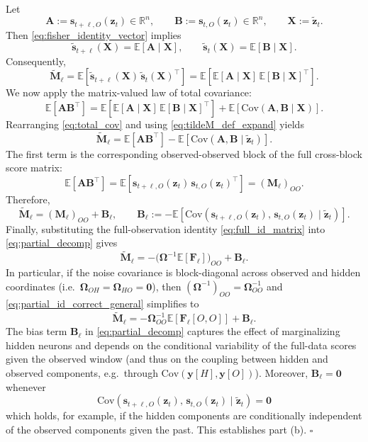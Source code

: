\documentclass{article}
\theoremstyle{plain}
\theoremstyle{definition}
\theoremstyle{remark}
\newcommand{\R}{\mathbb{R}}
\newcommand{\E}{\mathbb{E}}
\newcommand{\Cov}{\mathrm{Cov}}
\newcommand{\1}{\mathbf{1}}
\newcommand{\y}{\bm{y}}
\newcommand{\z}{\bm{z}}
\newcommand{\s}{\bm{s}}
\begin{document}
Let
$$
\bm{A}:=\s_{t+\ell,O}(\z_t)\in\R^{n},
\qquad
\bm{B}:=\s_{t,O}(\z_t)\in\R^{n},
\qquad
\bm{X}:=\tilde{\z}_t.
$$
Then \eqref{eq:fisher_identity_vector} implies
$$
\tilde{\s}_{t+\ell}(\bm{X}) = \E[\bm{A}\mid \bm{X}],
\qquad
\tilde{\s}_{t}(\bm{X}) = \E[\bm{B}\mid \bm{X}].
$$
Consequently,
\begin{equation}
\tilde{\bm{M}}_\ell
=
\E\!\left[\tilde{\s}_{t+\ell}(\bm{X})\,\tilde{\s}_{t}(\bm{X})^\top\right]
=
\E\!\left[\E[\bm{A}\mid \bm{X}]\,\E[\bm{B}\mid \bm{X}]^\top\right].
\label{eq:tildeM_def_expand}
\end{equation}
We now apply the matrix-valued law of total covariance:
\begin{equation}
\E[\bm{A}\bm{B}^\top]
=
\E\!\left[\E[\bm{A}\mid \bm{X}]\,\E[\bm{B}\mid \bm{X}]^\top\right]
+
\E\!\left[\Cov(\bm{A},\bm{B}\mid \bm{X})\right].
\label{eq:total_cov}
\end{equation}
Rearranging \eqref{eq:total_cov} and using \eqref{eq:tildeM_def_expand} yields
\begin{equation}
\tilde{\bm{M}}_\ell
=
\E[\bm{A}\bm{B}^\top]
-
\E\!\left[\Cov(\bm{A},\bm{B}\mid \tilde{\z}_t)\right].
\label{eq:tildeM_totalcov}
\end{equation}
The first term is the corresponding observed-observed block of the full cross-block score matrix:
$$
\E[\bm{A}\bm{B}^\top]
=
\E\!\left[\s_{t+\ell,O}(\z_t)\,\s_{t,O}(\z_t)^\top\right]
=
(\bm{M}_\ell)_{OO}.
$$
Therefore,
\begin{equation}
\tilde{\bm{M}}_\ell
=
(\bm{M}_\ell)_{OO}
+
\bm{B}_\ell,
\qquad
\bm{B}_\ell
:=
-\E\!\left[\Cov\!\left(\s_{t+\ell,O}(\z_t),\,\s_{t,O}(\z_t)\mid \tilde{\z}_t\right)\right].
\label{eq:partial_decomp}
\end{equation}
Finally, substituting the full-observation identity \eqref{eq:full_id_matrix} into \eqref{eq:partial_decomp} gives
\begin{equation}
\tilde{\bm{M}}_\ell
=
-\bigl(\bm{\Omega}^{-1}\E[\bm{F}_\ell]\bigr)_{OO}
+
\bm{B}_\ell.
\label{eq:partial_id_correct_general}
\end{equation}
In particular, if the noise covariance is block-diagonal across observed and hidden coordinates (i.e.\ $\bm{\Omega}_{OH}=\bm{\Omega}_{HO}=\bm{0}$), then $(\bm{\Omega}^{-1})_{OO}=\bm{\Omega}_{OO}^{-1}$ and \eqref{eq:partial_id_correct_general} simplifies to
\begin{equation}
\tilde{\bm{M}}_\ell
=
-\bm{\Omega}_{OO}^{-1}\E[\bm{F}_\ell[O,O]]
+
\bm{B}_\ell.
\label{eq:partial_id_correct_blockdiag}
\end{equation}
The bias term $\bm{B}_\ell$ in \eqref{eq:partial_decomp} captures the effect of marginalizing hidden neurons and depends on the conditional variability of the full-data scores given the observed window (and thus on the coupling between hidden and observed components, e.g.\ through $\Cov(\y[H],\y[O])$). Moreover, $\bm{B}_\ell=\bm{0}$ whenever
$$
\Cov\!\left(\s_{t+\ell,O}(\z_t),\,\s_{t,O}(\z_t)\mid \tilde{\z}_t\right)=\bm{0}
$$
which holds, for example, if the hidden components are conditionally independent of the observed components given the past. This establishes part (b). \hfill $\square$
\end{document}
